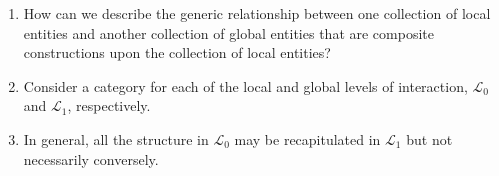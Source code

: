 \begin{frame}
\begin{enumerate}
\item How can we describe the generic relationship between one collection of local entities and another collection of global entities that are composite constructions upon the collection of local entities?

\item Consider a category for each of the local and global levels of interaction, $\mathcal{L}_0$ and $\mathcal{L}_1$, respectively. 

\item In general, all the structure in $\mathcal{L}_0$ may be recapitulated in $\mathcal{L}_1$ but not necessarily conversely.
\end{enumerate}
\end{frame}